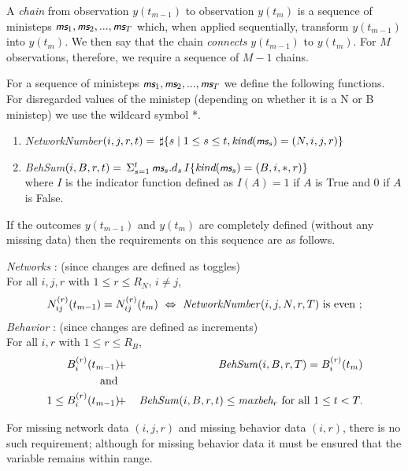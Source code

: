 \documentclass[a4paper,fleqn,12pt]{article}
\newcommand{\maxr}{\textit{maxbeh}_r}
\newcommand{\ms}{\textsl{\textsf{\small ms}}} %
\begin{document}
A \emph{chain} from observation $y(t_{m-1})$
to observation $y(t_m)$ is a sequence of ministeps $\ms_1 , \ms_2 , ..., \ms_T$
which, when applied sequentially, transform $y(t_{m-1})$ into $y(t_{m})$.
We then say that the chain \emph{connects}  $y(t_{m-1})$ to $y(t_m)$.
For $M$ observations, therefore, we require a sequence of $M-1$ chains.

For a sequence of ministeps $\ms_1 , \ms_2 , ..., \ms_T$
we define the following functions.
For disregarded values of the ministep (depending on whether it is a N or B
ministep) we use the wildcard symbol *.
\begin{enumerate}[resume]
\item \textit{NetworkNumber}$(i,j,r,t)  =  \,  \sharp\{ s \mid 1 \leq s \leq t, \textit{kind}(\ms_s) = (N,i,j,r)  \} $
\item \textit{BehSum}$(i,B,r,t)  = \,   \Sigma_{s=1}^t \, \ms_s.d_s\,
                      I\{ \textit{kind}(\ms_s) = (B,i,*,r) \} $\\
      where $I$ is the indicator function defined as $I(A) = 1$ if $A$ is True
      and 0 if $A$ is False.
\end{enumerate}

If the outcomes $y(t_{m-1})$ and $y(t_m)$ are completely defined
(without any missing data) then the requirements on this sequence are as follows.

\emph{Networks} : (since changes are defined as toggles)\\
For all $i, j, r$ with $1 \leq r \leq R_N$, $i \neq j$,
\[
N^{(r)}_{ij}(t_{m-1}) = N^{(r)}_{ij}(t_m) \ \Leftrightarrow \
       \text{\textit{NetworkNumber}}(i,j,N,r,T) \text{ is even }; \label{netrec}
 \]
\emph{Behavior} : (since changes are defined as increments)\\
For all $i, r$ with $1 \leq r \leq R_B$,
\begin{eqnarray}
B^{(r)}_{i}(t_{m-1}) \! &+&  \! \text{ \textit{BehSum}}(i,B,r,T) = B^{(r)}_{i}(t_m)  \label{behrec1} \\
\text{and} &&  \nonumber \\
1 \leq B^{(r)}_{i}(t_{m-1}) \!  &+&  \! \text{ \textit{BehSum}}(i,B,r,t) \leq
                             \maxr   \text{ for all } 1 \leq t < T.   \label{behrec2}
\end{eqnarray}


For missing network data $(i,j,r)$ and missing behavior data $(i,r)$,
there is no such requirement; although for missing behavior data
it must be ensured that the variable remains within range.
\end{document}
